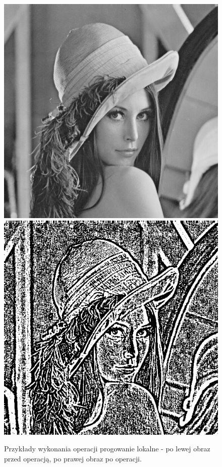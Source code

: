 \documentclass{article}
\begin{document}
\begin{figure}[!htb]
\includegraphics[scale=0.2]{img/lena_8bit.png} 
\includegraphics[scale=0.2]{img/Progowanie_Lokalne_lena_8bit.png} 
\caption{Przykłady wykonania operacji progowanie lokalne - po lewej obraz przed operacją, po prawej obraz po operacji. }
\end{figure}
\end{document}
